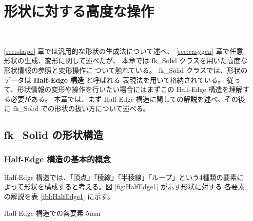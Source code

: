 \chapter{形状に対する高度な操作} \label{sec:reference} ~

\ref{sec:shape} 章では汎用的な形状の生成法について述べ、
\ref{sec:easygen} 章で任意形状の生成、変形に関して述べたが、
本章では fk\_Solid クラスを用いた高度な形状情報の参照と変形操作に
ついて触れている。
fk\_Solid クラスでは、形状のデータは \textbf{Half-Edge 構造} と呼ばれる
表現法を用いて格納されている。
従って、形状情報の変形や操作を行いたい場合にはまずこの
Half-Edge 構造を理解する必要がある。
本章では、まず Half-Edge 構造に関しての解説を述べ、その後に
fk\_Solid での形状の扱い方について述べる。
\section{fk\_Solid の形状構造}
\subsection{Half-Edge 構造の基本的概念}
Half-Edge 構造では、「頂点」「稜線」「半稜線」「ループ」という4種類の要素に
よって形状を構成すると考える。図 \ref{fig:HalfEdge1} が示す形状に対する
各要素の解説を表 \ref{tbl:HalfEdge1} に示す。

	{Half-Edge 構造での各要素}{-5mm}

